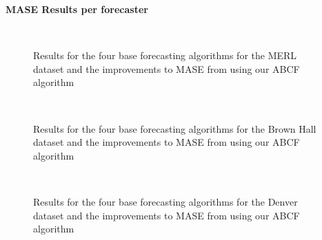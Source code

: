 \newpage
\newpage

\bigskip 
\noindent \textbf{MASE Results per forecaster} \\

\begin{figure}[!h]
	\begin{center}
		 \\
	\end{center}
	\caption{Results for the four base forecasting algorithms for the MERL dataset and the improvements to MASE from using our ABCF algorithm}
	\label{fig:mase_merl_results}
\end{figure}

\begin{figure}[!b]
	\begin{center}
		 \\
	\end{center}
	\caption{Results for the four base forecasting algorithms for the Brown Hall dataset and the improvements to MASE from using our ABCF algorithm}
	\label{fig:mase_brown_results}
\end{figure}

\begin{figure}[!t]
	\begin{center}
		 \\
	\end{center}
	\caption{Results for the four base forecasting algorithms for the Denver dataset and the improvements to MASE from using our ABCF algorithm}
	\label{fig:mase_denver_results}
\end{figure}



